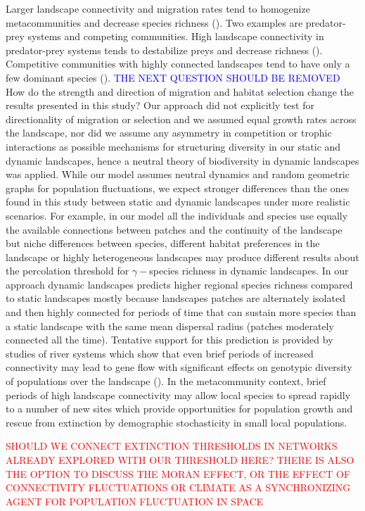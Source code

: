 \documentclass[12pt]{article}
\newcommand{\carlos}[1]{\textcolor{Red}{#1}}
\newcommand{\GM}[1]{\textcolor{Blue}{#1}}
\begin{document}
Larger landscape connectivity and migration rates tend to homogenize metacommunities and decrease species richness (\cite{ellneretal2001, foxetal2011}). Two examples are predator-prey systems and competing communities. High landscape connectivity in predator-prey systems tends to destabilize preys and decrease richness (\cite{ellneretal2001, foxetal2011}). Competitive communities with highly connected landscapes tend to have only a few dominant species (\cite{Holyoaketal2005}). \GM{THE NEXT QUESTION SHOULD BE REMOVED} How do the strength and direction of migration and habitat selection change the results presented in this study? Our approach did not explicitly test for directionality of migration or selection and we assumed equal growth rates across the landscape, nor did we assume any asymmetry in competition or trophic interactions as possible mechanisms for structuring diversity in our static and dynamic landscapes, hence a neutral theory of biodiversity in dynamic landscapes was applied. While our model assumes neutral dynamics and random geometric graphs for population fluctuations, we expect stronger differences than the ones found in this study between static and dynamic landscapes under more realistic scenarios. For example, in our model all the individuals and species use equally the available connections between patches and the continuity of the landscape but niche differences between species, different habitat preferences in the landscape or highly heterogeneous landscapes may produce different results about the percolation threshold for $\gamma-$species richness in dynamic landscapes. In our approach dynamic landscapes predicts higher regional species richness compared to static landscapes mostly because landscapes patches are alternately isolated and then highly connected for periods of time that can sustain more species than a static landscape with the same mean dispersal radius (patches moderately connected all the time). Tentative support for this prediction is provided by studies of river systems which show that even brief periods of increased connectivity may lead to gene flow with significant effects on genotypic diversity of populations over the landscape (\cite{BoizardEtAl2009}). In the metacommunity context, brief periods of high landscape connectivity may allow local species to spread rapidly to a number of new sites which provide opportunities for population growth and rescue from extinction by demographic stochasticity in small local populations. 

\carlos{SHOULD WE CONNECT EXTINCTION THRESHOLDS IN NETWORKS ALREADY EXPLORED WITH OUR THRESHOLD HERE? THERE IS ALSO THE OPTION TO DISCUSS THE MORAN EFFECT, OR THE EFFECT OF CONNECTIVITY FLUCTUATIONS OR CLIMATE AS A SYNCHRONIZING AGENT FOR POPULATION FLUCTUATION IN SPACE}
\end{document}
